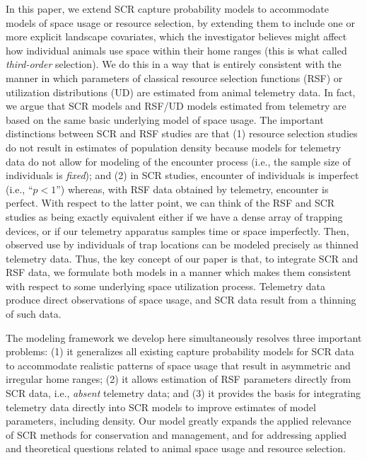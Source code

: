 \documentclass[12pt]{article}
\begin{document}
In this paper, we extend SCR capture probability models to accommodate
models of space usage or resource selection, by extending them to
include one or more explicit landscape covariates, which the
investigator believes might affect how individual animals use space
within their home ranges (this is what \citep{johnson:1980} called {\it
  third-order} selection). We do this in a way that is entirely
consistent with the manner in which parameters of classical resource
selection functions (RSF) \citep{manly_etal:2002} or utilization
distributions (UD) \citep{worton:1989, fieberg:2005, fieberg:2007} are
estimated from animal telemetry data.  In fact, we argue that SCR
models and RSF/UD models estimated from telemetry are based on the
same basic underlying model of space usage. The important distinctions
between SCR and RSF studies are that (1) resource selection studies do
not result in estimates of population density because models for
telemetry data do not allow for modeling of the encounter process
(i.e., the sample size of individuals is {\it fixed}); and (2) in SCR
studies, encounter of individuals is imperfect (i.e., ``$p<1$'')
whereas, with RSF data obtained by telemetry, encounter is perfect.
With respect to the latter point, we can think of the RSF and SCR
studies as being exactly equivalent either if we have a dense array of
trapping devices, or if our telemetry apparatus samples time or space
imperfectly.  Then, observed use by individuals of trap locations can
be modeled precisely as thinned telemetry data.  Thus, the key
concept of our paper is that, to
 integrate SCR and RSF data, we
formulate both models in a manner which makes them
consistent with respect to some underlying space utilization
process. Telemetry data produce direct observations of space usage,
and SCR data result from a thinning of such data.

The modeling framework we develop here simultaneously resolves three
important 
problems: (1) it generalizes all existing capture probability models
for SCR data to accommodate realistic patterns of space usage that
result in asymmetric and irregular home
ranges; 
(2) it allows estimation of RSF parameters directly from SCR data,
i.e., {\it absent} telemetry data; and (3) it provides the basis for
integrating telemetry data directly into SCR models to improve
estimates of model parameters, including density.  Our model greatly
expands the applied relevance of SCR methods for conservation and
management, and for addressing applied and theoretical questions
related to animal space usage and resource selection.
\end{document}
